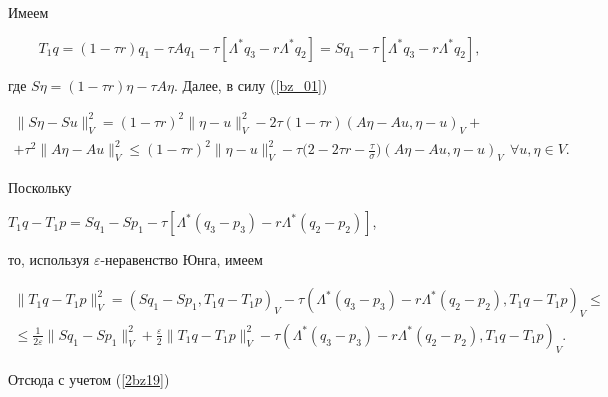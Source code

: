 \begin{pf}


Имеем


$$


T_1 q=(1- \tau r)q_1-\tau A q_1 -


\tau [{\Lambda^* q_3-r \Lambda^* q_2}]=


S q_1-\tau [{\Lambda^* q_3-r \Lambda^* q_2}] ,


$$


где $S \eta=(1- \tau r) \eta-\tau A \eta$. Далее, в силу (\ref{bz_01}) 


\begin{multline}


\| {S \eta-S u} \|_V^2=(1- \tau r)^2 \| {\eta-u} \|_V^2 -


2 \tau (1- \tau r) (A \eta-A u, \eta-u)_V+ \\


%


+\tau^2 \| {A \eta-A u} \|_V^2 \leq


(1- \tau r)^2 \| {\eta-u} \|_V^2- 


\tau \bigg(2-2 \tau r-\frac {\tau} {\sigma}\bigg) (A \eta-A u, \eta-u)_V


\ \ \forall u, \eta \in V. 


\label{2bz19}


\end{multline}


Поскольку


$T_1 q-T_1 p=S q_1-S p_1-


\tau [{\Lambda^* (q_3-p_3)-r \Lambda^* (q_2-p_2)}]$,


то, используя $\varepsilon$-неравенство Юнга, имеем


\begin{multline*}


\| {T_1 q-T_1 p} \|_V^2=(S q_1-S p_1, T_1 q-T_1 p)_V-


\tau ({\Lambda^* (q_3-p_3)-r \Lambda^* (q_2-p_2), T_1 q-T_1 p})_V \leq \\


%


\leq \frac {1}{2 \varepsilon} \| {S q_1-S p_1} \|_V^2+


\frac {\varepsilon} {2} \| {T_1 q-T_1 p} \|_V^2 -


\tau ({\Lambda^* (q_3-p_3)-r \Lambda^* (q_2-p_2), T_1 q-T_1 p})_V.


\end{multline*}


Отсюда с учетом (\ref{2bz19})



\end{pf}
